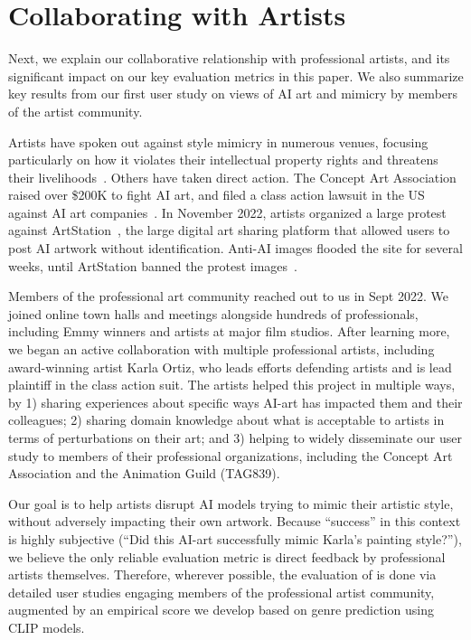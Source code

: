 \secspace
\section{Collaborating with Artists}
\label{sec:artists}
Next, we explain our collaborative relationship with professional artists,
and its significant impact on our key evaluation metrics in this paper. We
also summarize key results from our first user study on views of AI art and
mimicry by members of the artist community.


Artists have spoken out against style mimicry in numerous venues, focusing
particularly on how it violates their intellectual property rights and
threatens their
livelihoods~\cite{guardian-artical,artical-1,artical-2, noai-protest}. Others
have taken direct action. The Concept Art Association raised over \$200K to
fight AI art, and filed a class action lawsuit in the US
against AI art companies~\cite{class-action}. In November 2022, artists
organized a large protest against ArtStation~\cite{noai-protest}, the large
digital art sharing platform that allowed users to post AI artwork without
identification. Anti-AI images flooded the site for several weeks, until
ArtStation banned the protest images~\cite{noai-result}. 

Members of the professional art community reached out to us in Sept 2022. We
joined online town halls and meetings alongside hundreds of professionals,
including Emmy winners and artists at major film studios. After learning
more, we began an active collaboration with multiple professional artists,
including award-winning artist Karla Ortiz, who leads efforts defending
artists and is lead plaintiff in the class action suit.
The artists helped this project in multiple ways, by 1) sharing experiences
about specific ways AI-art has impacted them and their colleagues; 2) sharing
domain knowledge about what is acceptable to artists in terms of
perturbations on their art; and 3) helping to widely disseminate our user study to
members of their professional organizations, including the Concept Art
Association and the Animation Guild (TAG839).

 Our goal is to help artists
disrupt AI models trying to mimic their artistic style, without adversely
impacting their own artwork. Because ``success'' in this context is highly
subjective (``Did this AI-art successfully mimic Karla's painting style?''),
we believe the only reliable evaluation metric is direct feedback by
professional artists themselves. Therefore, wherever possible, the evaluation
of \system{} is done via detailed user studies engaging members of the
professional artist community, augmented by an empirical score we develop based on
genre prediction using CLIP models.

